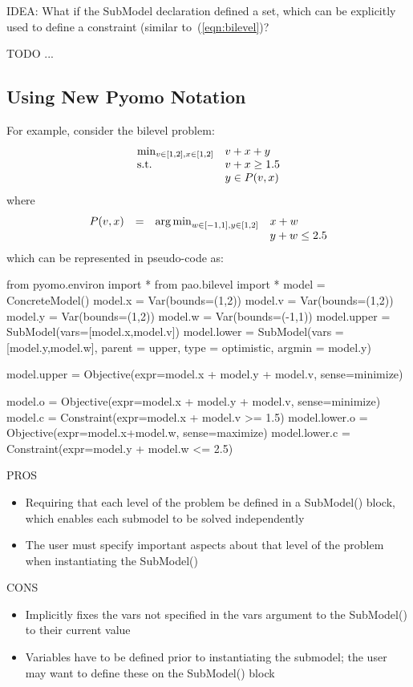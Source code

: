 IDEA:  What if the SubModel declaration defined a set, which can be explicitly used to
define a constraint (similar to~(\ref{eqn:bilevel})?

TODO ...


\subsection{Using New Pyomo Notation}

For example, consider the bilevel problem:
\begin{equation}
\label{eqn:bilevel_ex1}
\begin{array}{ll}
\min_{v \in [1,2], x \in [1,2]}   & v + x + y\\
\textrm{s.t.}                 & v + x\geq 1.5\\
                    & y \in P(v,x)
\end{array}
\end{equation}
where 
\[
\begin{array}{llll}
P(v,x) & = & \operatorname*{arg\,min}_{w \in [-1,1], y \in [1,2]}    & x + w\\
 & &                            &  y + w \leq 2.5
\end{array}
\]
which can be represented in  pseudo-code as:

\begin{qlisting}
from pyomo.environ import *
from pao.bilevel import *
model = ConcreteModel()
model.x = Var(bounds=(1,2))
model.v = Var(bounds=(1,2))
model.y = Var(bounds=(1,2))
model.w = Var(bounds=(-1,1))
model.upper = SubModel(vars=[model.x,model.v])
model.lower = SubModel(vars = [model.y,model.w], parent = upper, 
		type = optimistic, argmin = model.y)

model.upper = Objective(expr=model.x + model.y + model.v, sense=minimize)

model.o = Objective(expr=model.x + model.y + model.v, sense=minimize)
model.c = Constraint(expr=model.x + model.v >= 1.5)
model.lower.o = Objective(expr=model.x+model.w, sense=maximize)
model.lower.c = Constraint(expr=model.y + model.w <= 2.5)
\end{qlisting}

\noindent PROS
\begin{itemize}
\item Requiring that each level of the problem be defined in a SubModel() block, which enables each submodel to be solved independently
\item The user must specify important aspects about that level of the problem when instantiating the SubModel()
\end{itemize}
CONS
\begin{itemize}
\item Implicitly fixes the vars not specified in the vars argument to the SubModel() to their current value
\item Variables have to be defined prior to instantiating the submodel; the user may want to define these on the SubModel() block
\end{itemize}

